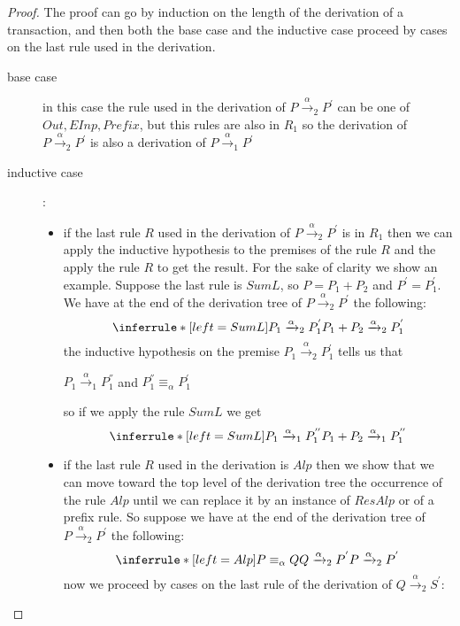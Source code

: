   \begin{proof}
    The proof can go by induction on the length of the derivation of a transaction, and then both the base case and the inductive case proceed by cases on the last rule used in the derivation.
    \begin{description}
      \item[base case]
	in this case the rule used in the derivation of $P\xrightarrow{\alpha}_{2}P^{'}$ can be one of $Out, EInp, Prefix$, but this rules are also in $R_{1}$ so the derivation of $P\xrightarrow{\alpha}_{2}P^{'}$ is also a derivation of $P\xrightarrow{\alpha}_{1}P^{'}$
      \item[inductive case]:
	\begin{itemize}
	  \item 
	    if the last rule $R$ used in the derivation of $P\xrightarrow{\alpha}_{2}P^{'}$ is in $R_{1}$ then we can apply the inductive hypothesis to the premises of the rule $R$ and the apply the rule $R$ to get the result. For the sake of clarity we show an example. Suppose the last rule is $SumL$, so $P=P_{1}+P_{2}$ and $P^{'}=P_{1}^{'}$. We have at the end of the derivation tree of $P\xrightarrow{\alpha}_{2}P^{'}$ the following:
	    \[
	      \inferrule* [left=SumL]{
		  P_{1}\xrightarrow{\alpha}_{2}P_{1}^{'}
	      }{
		P_{1}+P_{2}\xrightarrow{\alpha}_{2}P_{1}^{'}
	      }
	    \]
	    the inductive hypothesis on the premise $P_{1}\xrightarrow{\alpha}_{2}P_{1}^{'}$ tells us that
	    \begin{center}
	      $P_{1}\xrightarrow{\alpha}_{1}P_{1}^{''}$ and $P_{1}^{''}\equiv_{\alpha}P_{1}^{'}$ 
	    \end{center}
	    so if we apply the rule $SumL$ we get 
	    \[
	      \inferrule* [left=SumL]{
		  P_{1}\xrightarrow{\alpha}_{1}P_{1}^{''}
	      }{
		P_{1}+P_{2}\xrightarrow{\alpha}_{1}P_{1}^{''}
	      }
	    \]
	  \item
	    if the last rule $R$ used in the derivation is $Alp$ then we show that we can move toward the top level of the derivation tree the occurrence of the rule $Alp$ until we can replace it by an instance of $ResAlp$ or of a prefix rule. So suppose we have at the end of the derivation tree of $P\xrightarrow{\alpha}_{2}P^{'}$ the following:
	    \[
	      \inferrule* [left=Alp]{
		  P\equiv_{\alpha} Q
		\\
		  Q\xrightarrow{\alpha}_{2}P^{'}
	      }{
		P\xrightarrow{\alpha}_{2}P^{'}
	      }
	    \]
	    now we proceed by cases on the last rule of the derivation of $Q\xrightarrow{\alpha}_{2}S^{'}$:

\end{itemize}
\end{description}
\end{proof}
